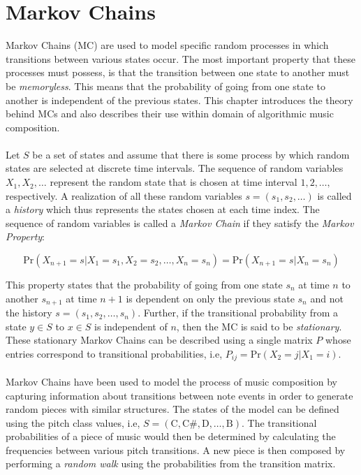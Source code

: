 \documentclass[master.tex]{subfiles}
\begin{document}
\section{Markov Chains}
Markov Chains (MC) are used to model specific random processes in which transitions between various states occur. The most important property that these processes must possess, is that the transition between one state to another must be \emph{memoryless}. This means that the probability of going from one state to another is independent of the previous states.   This chapter introduces the theory behind MCs and also describes their use within domain of algorithmic music composition. 
\\
\\
Let $S$ be a set of states and assume that there is some process by which random states are selected at discrete time intervals. The sequence of random variables $X_1, X_2, \dots$ represent the random state that is chosen at time interval $1, 2, \dots,$ respectively. A realization of all these random variables $s = (s_1, s_2, \dots)$ is called a \emph{history} which thus represents the states chosen at each time index.  The sequence of random variables is called a \emph{Markov Chain} if they satisfy the \emph{Markov Property}: 

\begin{equation}
\text{Pr}(X_{n+1} = s | X_1 = s_1, X_2 = s_2,\dots, X_n = s_n) = \text{Pr}(X_{n+1} = s | X_n = s_n)
\end{equation}

This property states that the probability of going from one state $s_n$ at time $n$ to another $s_{n+1}$ at time $n + 1$ is dependent on only the previous state $s_n$ and not the history $s = (s_1, s_2, \dots, s_n)$. Further, if the transitional probability from a state $y \in S$ to $x \in S$ is independent of $n$, then the MC is said to be \emph{stationary}.  These stationary Markov Chains can be described using a single matrix $P$ whose entries correspond to transitional probabilities, i.e, $P_{ij} = \text{Pr}(X_2 = j | X_1 = i)$. 
\\
\\
Markov Chains have been used to model the process of music composition by capturing information about transitions between note events in order to generate random pieces with similar structures. The states of the model can be defined using the pitch class values, i.e, $S = (\text{C},\text{C\#}, \text{D}, \dots, \text{B})$. The transitional probabilities of a piece of music would then be determined by calculating the frequencies between various pitch transitions. A new piece is then composed by performing a \emph{random walk} using the probabilities from the transition matrix.
\end{document}
